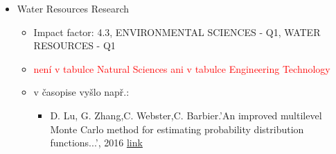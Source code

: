 \documentclass[a4paper]{article}
\begin{document}
\begin{itemize}
\item  Water Resources Research
\begin{itemize}
\item Impact factor: 4.3, ENVIRONMENTAL SCIENCES - Q1, WATER RESOURCES - Q1
\item \textcolor{red}{není v tabulce Natural Sciences ani v tabulce Engineering Technology}
\item v časopise vyšlo např.:
\begin{itemize}
\item D. Lu, G. Zhang,C. Webster,C. Barbier.'An improved multilevel Monte Carlo method for estimating probability distribution functions...', 2016 \href{https://agupubs.onlinelibrary.wiley.com/doi/full/10.1002/2016WR019475}{link}
\end{itemize}
\end{itemize}


\end{itemize}
\end{document}
